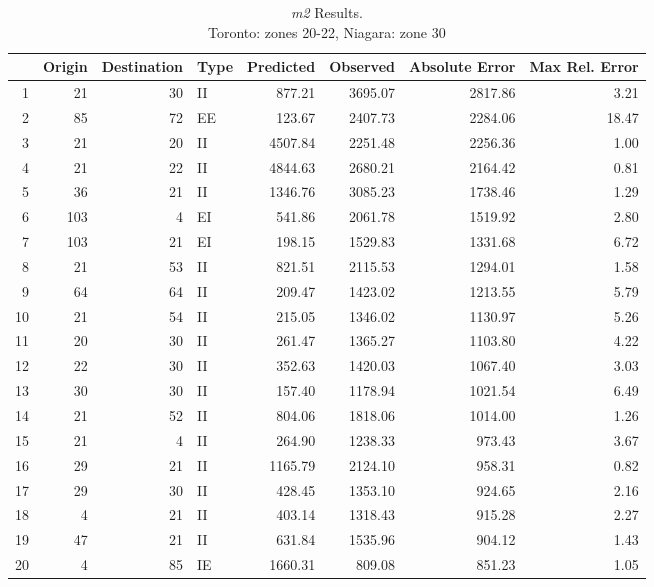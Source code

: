 \begin{table}[ht]
\caption{\textit{m2} Results. \\Toronto: zones 20-22, Niagara: zone 30}
\label{table:m2-error-table}
\centering
\begin{tabular}{rrrlrrrr}
  \toprule
 & Origin & Destination & Type & Predicted & Observed & Absolute Error & Max Rel. Error \\ 
  \midrule
1 & 21 & 30 & II & 877.21 & 3695.07 & 2817.86 & 3.21 \\ 
  2 & 85 & 72 & EE & 123.67 & 2407.73 & 2284.06 & 18.47 \\ 
  3 & 21 & 20 & II & 4507.84 & 2251.48 & 2256.36 & 1.00 \\ 
  4 & 21 & 22 & II & 4844.63 & 2680.21 & 2164.42 & 0.81 \\ 
  5 & 36 & 21 & II & 1346.76 & 3085.23 & 1738.46 & 1.29 \\ 
  6 & 103 & 4 & EI & 541.86 & 2061.78 & 1519.92 & 2.80 \\ 
  7 & 103 & 21 & EI & 198.15 & 1529.83 & 1331.68 & 6.72 \\ 
  8 & 21 & 53 & II & 821.51 & 2115.53 & 1294.01 & 1.58 \\ 
  9 & 64 & 64 & II & 209.47 & 1423.02 & 1213.55 & 5.79 \\ 
  10 & 21 & 54 & II & 215.05 & 1346.02 & 1130.97 & 5.26 \\ 
  11 & 20 & 30 & II & 261.47 & 1365.27 & 1103.80 & 4.22 \\ 
  12 & 22 & 30 & II & 352.63 & 1420.03 & 1067.40 & 3.03 \\ 
  13 & 30 & 30 & II & 157.40 & 1178.94 & 1021.54 & 6.49 \\ 
  14 & 21 & 52 & II & 804.06 & 1818.06 & 1014.00 & 1.26 \\ 
  15 & 21 & 4 & II & 264.90 & 1238.33 & 973.43 & 3.67 \\ 
  16 & 29 & 21 & II & 1165.79 & 2124.10 & 958.31 & 0.82 \\ 
  17 & 29 & 30 & II & 428.45 & 1353.10 & 924.65 & 2.16 \\ 
  18 & 4 & 21 & II & 403.14 & 1318.43 & 915.28 & 2.27 \\ 
  19 & 47 & 21 & II & 631.84 & 1535.96 & 904.12 & 1.43 \\ 
  20 & 4 & 85 & IE & 1660.31 & 809.08 & 851.23 & 1.05 \\ 
   \bottomrule
\end{tabular}
\end{table}


